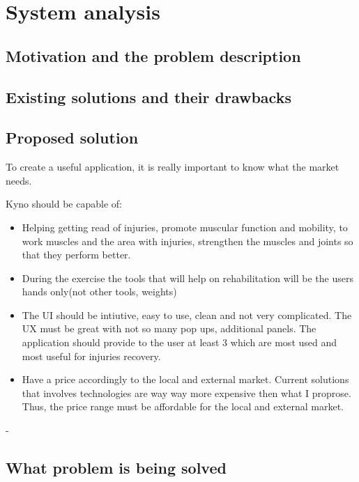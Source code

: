 \section{System analysis}

\subsection{Motivation and the problem description}

\subsection{Existing solutions and their drawbacks}

\subsection {Proposed solution}
To create a useful application, it is really important to know what the market needs. 

Kyno should be capable of:

\begin{itemize}
\item Helping getting read of injuries, promote muscular function and mobility, to work muscles and the area with injuries, strengthen the muscles and joints so that they perform better.
\item During the exercise the tools that will help on rehabilitation will be the users hands only(not other tools, weights)

\item The UI should be intiutive, easy to use, clean and not very complicated. The UX must be great with not so many pop ups, additional panels. The application should provide to the user at least 3 which are most used and most useful for injuries recovery.
\item Have a price accordingly to the local and external market. Current solutions that involves technologies are way way more expensive then what I proprose. Thus, the price range must be affordable for the local and external market.
 
\end{itemize}
- 



\subsection{What problem is being solved}

